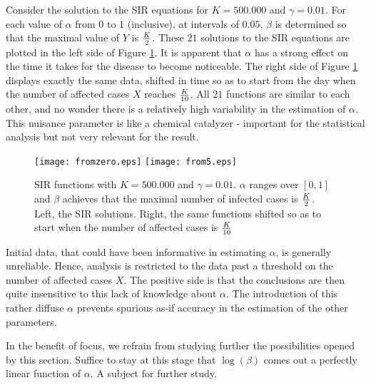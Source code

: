 \documentclass{article}
\begin{document}
Consider the solution to the SIR equations for $K=500.000$ and $\gamma=0.01$. For each value of $\alpha$ from $0$ to $1$ (inclusive), at intervals of $0.05$, $\beta$ is determined so that the maximal value of $Y$ is ${K \over 2}$. These $21$ solutions to the SIR equations are plotted in the left side of Figure \ref{fromtimes}. It is apparent that $\alpha$ has a strong effect on the time it takes for the disease to become noticeable. The right side of Figure \ref{fromtimes} displays exactly the same data, shifted in time so as to start from the day when the number of affected cases $X$ reaches ${K \over 10}$. All $21$ functions are similar to each other, and no wonder there is a relatively high variability in the estimation of $\alpha$. This nuisance parameter is like a chemical catalyzer - important for the statistical analysis but not very relevant for the result.

\begin{figure}
\begin{center}
{\texttt{[image: fromzero.eps]}}
\qquad
{\texttt{[image: from5.eps]}}
\end{center}
\begin{center}
\caption{SIR functions with $K=500.000$ and $\gamma=0.01$. $\alpha$ ranges over $[0,1]$ and $\beta$ achieves that the maximal number of infected cases is ${K \over 2}$. Left, the SIR solutions. Right, the same functions shifted so as to start when the number of affected cases is ${K \over 10}$
}
\label{fromtimes}
\end{center}
\end{figure}


Initial data, that could have been informative in estimating $\alpha$, is generally unreliable. Hence, analysis is restricted to the data past a threshold on the number of affected cases $X$. The positive side is that the conclusions are then quite insensitive to this lack of knowledge about $\alpha$. The introduction of this rather diffuse $\alpha$ prevents spurious as-if accuracy in the estimation of the other parameters.

In the benefit of focus, we refrain from studying further the possibilities opened by this section. Suffice to stay at this stage that $\log(\beta)$ comes out a perfectly linear function of $\alpha$. A subject for further study.
\end{document}
